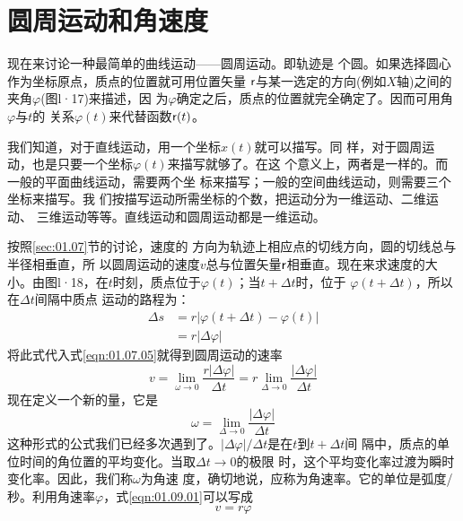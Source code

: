 \section{圆周运动和角速度}\label{sec:01.09}

    现在来讨论一种最简单的曲线运动——圆周运动。即轨迹是
个圆。如果选择圆心作为坐标原点，质点的位置就可用位置矢量
${\sf r}$与某一选定的方向(例如$X$轴)之间的夹角$\varphi$(图l·17)来描述，因
为$\varphi$确定之后，质点的位置就完全确定了。因而可用角$\varphi$与$t$的
关系$\varphi(t)$来代替函数${\sf r}(t)$。

    我们知道，对于直线运动，用一个坐标$x(t)$就可以描写。同
样，对于圆周运动，也是只要一个坐标$\varphi(t)$来描写就够了。在这
个意义上，两者是一样的。而一般的平面曲线运动，需要两个坐
标来描写；一般的空间曲线运动，则需要三个坐标来描写。我
们按描写运动所需坐标的个数，把运动分为一维运动、二维运动、
三维运动等等。直线运动和圆周运动都是一维运动。

按照\ref{sec:01.07}节的讨论，速度的
方向为轨迹上相应点的切线方向，圆的切线总与半径相垂直，所
以圆周运动的速度$v$总与位置矢量${\sf r}$相垂直。现在来求速度的大
小。由图l·18，在$t$时刻，质点位于$\varphi(t)$；当$t+\Delta t$时，位于
$\varphi(t+\Delta t)$，所以在$\Delta t$间隔中质点
运动的路程为：
\begin{equation*}
    \begin{aligned}
        \Delta s &=r|\varphi(t+\Delta t)-\varphi(t)| \\
        &=r|\Delta \varphi|
    \end{aligned}
\end{equation*}
将此式代入式\eqref{eqn:01.07.05}就得到圆周运动的速率
\begin{equation}\label{eqn:01.09.01}
    v=\lim _{\omega \rightarrow 0} \frac{r|\Delta \varphi|}{\Delta t}=r \lim _{\Delta \rightarrow 0} \frac{|\Delta \varphi|}{\Delta t}
\end{equation}
现在定义一个新的量，它是
\begin{equation}\label{eqn:01.09.02}
    \omega=\lim _{\Delta \rightarrow 0} \frac{|\Delta \varphi|}{\Delta t}
\end{equation}
这种形式的公式我们已经多次遇到了。$|\Delta\varphi|/\Delta t$是在$t$到$t+\Delta t$间
隔中，质点的单位时间的角位置的平均变化。当取$\Delta t\rightarrow 0$的极限
时，这个平均变化率过渡为瞬时变化率。因此，我们称$\omega$为角速
度，确切地说，应称为角速率。它的单位是弧度/秒。利用角速率$\varphi$，式\eqref{eqn:01.09.01}可以写成
\begin{equation}\label{eqn:01.09.03}
    v=r\varphi
\end{equation}

